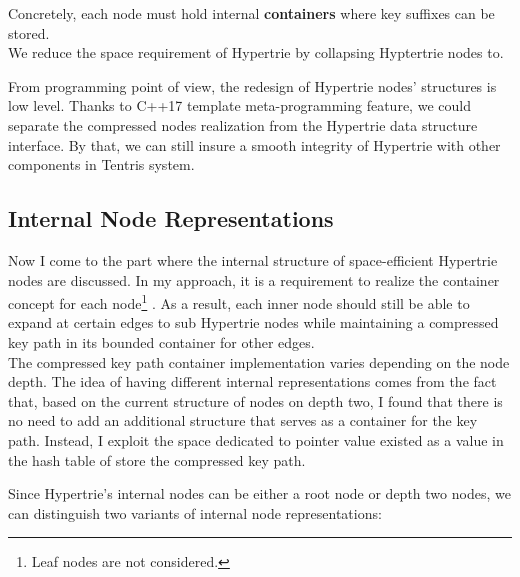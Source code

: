 Concretely, each node must hold internal \textbf{containers} where key suffixes can be stored. \\

We reduce the space requirement of Hypertrie by collapsing Hyptertrie nodes to. \\


From programming point of view, the redesign of Hypertrie nodes' structures is low level. Thanks to C++17 template meta-programming feature, we could separate the compressed nodes realization from the Hypertrie data structure interface. By that, we can still insure a smooth integrity of Hypertrie with other components in Tentris system. \\

\subsection{Internal Node Representations}
\label{ch:approach_node_structure}
Now I come to the part where the internal structure of space-efficient Hypertrie nodes are discussed. 
In my approach, it is a requirement to realize the container concept for each node\footnote{Leaf nodes are not considered.} . 
As a result, each inner node should still be able to expand at certain edges to sub Hypertrie nodes while maintaining a compressed key path in its bounded container for other edges. \\

The compressed key path container implementation varies depending on the node depth. 
The idea of having different internal representations comes from the fact that, based on the current structure of nodes on depth two, I found that there is no need to add an additional structure that serves as a container for the key path. 
Instead, I exploit the space dedicated to pointer value existed as a value in the hash table of store the compressed key path. \\ 


Since Hypertrie's internal nodes can be either a root node or depth two nodes, we can distinguish two variants of internal node representations: 


